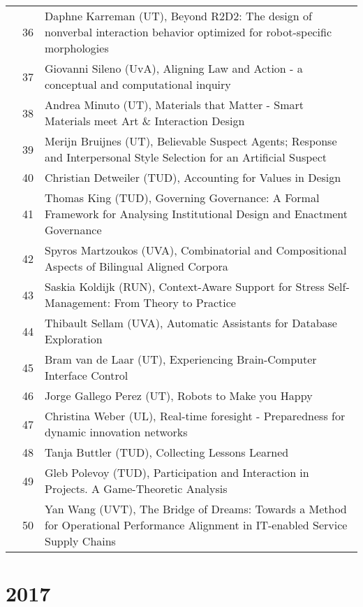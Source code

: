 {\begin{xltabular}{\linewidth}{@{} l @{\hspace{0.5em}} l @{\hspace{1em}} X @{}}
        &	 36	&	 Daphne Karreman (UT), Beyond R2D2: The design of nonverbal interaction behavior optimized for robot-specific morphologies\\
        &	 37	&	 Giovanni Sileno (UvA), Aligning Law and Action - a conceptual and computational inquiry\\
        &	 38	&	 Andrea Minuto (UT), Materials that Matter - Smart Materials meet Art \& Interaction Design\\
        &	 39	&	 Merijn Bruijnes (UT), Believable Suspect Agents; Response and Interpersonal Style Selection for an Artificial Suspect\\
        &	 40	&	 Christian Detweiler (TUD), Accounting for Values in Design\\
        &	 41	&	 Thomas King (TUD), Governing Governance: A Formal Framework for Analysing Institutional Design and Enactment Governance\\
        &	 42	&	 Spyros Martzoukos (UVA), Combinatorial and Compositional Aspects of Bilingual Aligned Corpora\\
        &	 43	&	 Saskia Koldijk (RUN), Context-Aware Support for Stress Self-Management: From Theory to Practice\\
        &	 44	&	 Thibault Sellam (UVA), Automatic Assistants for Database Exploration\\
        &	 45	&	 Bram van de Laar (UT), Experiencing Brain-Computer Interface Control\\
        &	 46	&	 Jorge Gallego Perez (UT), Robots to Make you Happy\\
        &	 47	&	 Christina Weber (UL), Real-time foresight - Preparedness for dynamic innovation networks\\
        &	 48	&	 Tanja Buttler (TUD), Collecting Lessons Learned\\
        &	 49	&	 Gleb Polevoy (TUD), Participation and Interaction in Projects. A Game-Theoretic Analysis\\
        &	 50	&	 Yan Wang (UVT), The Bridge of Dreams: Towards a Method for Operational Performance Alignment in IT-enabled Service Supply Chains\\

\end{xltabular}


\section*{2017}
\begin{xltabular}{\linewidth}{@{} l @{\hspace{0.5em}} l @{\hspace{1em}} X @{}}


\end{xltabular}}
